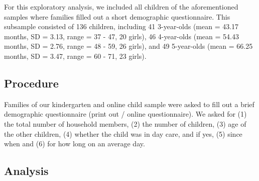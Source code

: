 \documentclass[
  man,floatsintext]{apa6}
\begin{document}
For this exploratory analysis, we included all children of the aforementioned samples where families filled out a short demographic questionnaire. This subsample consisted of
136 children, including
41 3-year-olds
(mean = 43.17 months,
SD = 3.13,
range = 37
- 47,
20 girls),
46 4-year-olds
(mean = 54.43 months,
SD = 2.76,
range = 48
- 59,
26 girls),
and 49 5-year-olds
(mean = 66.25 months,
SD = 3.47,
range = 60
- 71,
23 girls).

\hypertarget{procedure-2}{%
\subsection{Procedure}\label{procedure-2}}

Families of our kindergarten and online child sample were asked to fill out a brief demographic questionnaire (print out / online questionnaire). We asked for (1) the total number of household members, (2) the number of children, (3) age of the other children, (4) whether the child was in day care, and if yes, (5) since when and (6) for how long on an average day.

\hypertarget{analysis-2}{%
\subsection{Analysis}\label{analysis-2}}
\end{document}
